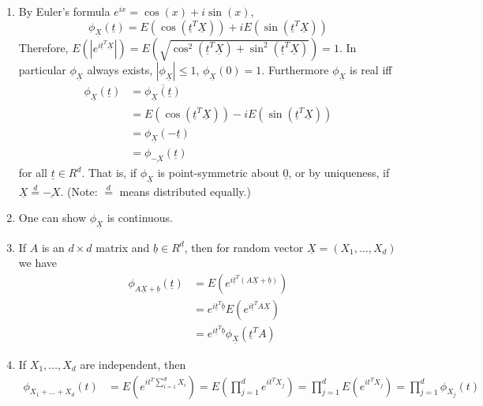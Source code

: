 \documentclass[10pt,letterpaper]{article}
\begin{document}
				\begin{enumerate}
					\item By Euler's formula $e^{ix}=\cos(x)+i\sin(x)$, $$\phi_{\underline{X}}(\underline{t})=E(\cos(\underline{t}^T\underline{X}))+iE(\sin(\underline{t}^T\underline{X}))$$
					Therefore, $E(|e^{i\underline{t}^T\underline{X}}|)=E(\sqrt{\cos^2(\underline{t}^T\underline{X})+\sin^2(\underline{t}^T\underline{X})})=1$. In particular $\phi_{\underline{X}}$ always exists, $|\phi_{\underline{X}}|\leq1$, $\phi_{\underline{X}}(0)=1$. Furthermore $\phi_{\underline{X}}$ is real iff
					\begin{align*}
						\phi_{\underline{X}}(\underline{t})&=\overline{\phi_{\underline{X}}(\underline{t})}\\
						&=E(\cos(\underline{t}^T\underline{X}))-iE(\sin(\underline{t}^T\underline{X}))\\
						&=\phi_{\underline{X}}(-\underline{t})\\
						&=\phi_{\underline{-X}}(\underline{t})
					\end{align*}
					for all $\underline{t}\in R^d$. That is, if $\phi_{\underline{X}}$ is point-symmetric about $\underline{0}$, or by uniqueness, if $\underline{X}\stackrel{d}{=}\underline{-X}$. (Note: $\stackrel{d}{=}$ means distributed equally.)
					
					\item One can show $\phi_{\underline{X}}$ is continuous.
					
					\item If $A$ is an $d\times d$ matrix and $\underline{b}\in R^d$, then for random vector $\underline{X}=(X_1, \dots, X_d)$ we have
					\begin{align*}
						\phi_{A\underline{X}+\underline{b}}(\underline{t})&=E(e^{i\underline{t}^T(A\underline{X}+\underline{b})})\\
						&=e^{i\underline{t}^T\underline{b}}E(e^{i\underline{t}^TA\underline{X}})\\
						&=e^{i\underline{t}^T\underline{b}}\phi_{\underline{X}}(\underline{t}^TA)
					\end{align*}
					
					\item If $X_1, \dots, X_d$ are independent, then
					\begin{align*}
						\phi_{X_1+\dots+X_d}(t)&=E(e^{it^T\sum_{i=1}^dX_i})
						=E(\prod_{j=1}^de^{it^TX_j})
						=\prod_{j=1}^dE(e^{it^TX_j})
						=\prod_{j=1}^d\phi_{X_j}(t)
					\end{align*}
				\end{enumerate}
\end{document}

